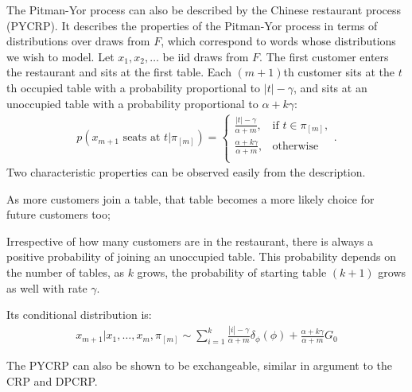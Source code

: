 The Pitman-Yor process can also be described by the Chinese restaurant process (PYCRP). It describes the properties of the Pitman-Yor process in terms of distributions over draws from $F$, which correspond to words whose distributions we wish to model. Let $x_1, x_2,\ldots$ be iid draws from $F$. The first customer enters the restaurant and sits at the first table. Each $(m+1)$th customer sits at the $t$th occupied table with a probability proportional to $|t|-\gamma$, and sits at an unoccupied table with a probability proportional to $\alpha+k\gamma$:
\begin{align}
	p(x_{m+1}\text{ seats at }t|\pi_{[m]}) = 
    	\begin{cases}
        	\frac{|t|-\gamma}{\alpha+m}, & \text{if }t\in\pi_{[m]},\\
           	\frac{\alpha+k\gamma}{\alpha+m}, & \text{otherwise}\\ 
        \end{cases}.
\end{align}
Two characteristic properties can be observed easily from the description. \begin{enumerate*}
\item As more customers join a table, that table becomes a more likely choice for future customers too;
\item Irrespective of how many customers are in the restaurant, there is always a positive probability of joining an unoccupied table. This probability depends on the number of tables, as $k$ grows, the probability of starting table $(k+1)$ grows as well with rate $\gamma$.
\end{enumerate*}

Its conditional distribution is:
\begin{align}\label{eq:pycrpconddist}
	x_{m+1}|x_1,\ldots,x_m, \pi_{[m]} \sim \sum_{i=1}^k \frac{|i|-\gamma}{\alpha+m}\delta_\phi(\phi) + \frac{\alpha+k\gamma}{\alpha+m}G_0
\end{align}

The PYCRP can also be shown to be exchangeable, similar in argument to the CRP and DPCRP. 

